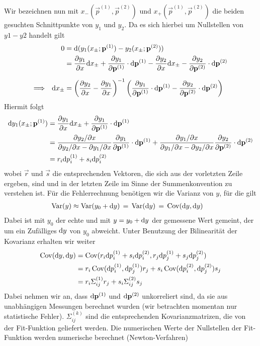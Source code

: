 Wir bezeichnen nun mit $x_{-}(\vec{p}^{(1)}, \vec{p}^{(2)})$ und $x_{+}(\vec{p}^{(1)}, \vec{p}^{(2)})$ die beiden gesuchten Schnittpunkte von $y_1$ und $y_2$. Da es sich hierbei um Nullstellen von $y1 - y2$ handelt gilt
%
\begin{align*}
               && 0 &= \mathrm{d}(y_1(x_{\pm}; \mathbf{p}^{(1)}) - y_2(x_{\pm}; \mathbf{p}^{(2)})) \\
                 && &=  \frac{\partial y_1}{\partial x} \mathrm{d} x_{\pm} + \frac{\partial y_1}{\partial \mathbf{p}^{(1)}} \cdot \mathrm{d} \mathbf{p}^{(1)}
                      - \frac{\partial y_2}{\partial x} \mathrm{d} x_{\pm} - \frac{\partial y_2}{\partial \mathbf{p}^{(2)}} \cdot \mathrm{d} \mathbf{p}^{(2)} \\[2mm]
\Longrightarrow&& \mathrm{d} x_{\pm} &= \left(\frac{\partial y_2}{\partial x} - \frac{\partial y_1}{\partial x}\right)^{-1}
                                \left( \frac{\partial y_1}{\partial \mathbf{p}^{(1)}}\cdot \mathrm{d} \mathbf{p}^{(1)} - \frac{\partial y_2}{\partial \mathbf{p}^{(2)}} \cdot \mathrm{d} \mathbf{p}^{(2)} \right)
\end{align*}
%
Hiermit folgt
%
\begin{align*}
    \mathrm{d} y_1(x_{\pm}; \mathbf{p}^{(1)}) &= \frac{\partial y_1}{\partial x} \mathrm{d} x_{\pm} + \frac{\partial y_1}{\partial \mathbf{p}^{(1)}} \cdot \mathrm{d} \mathbf{p}^{(1)} \\
                                   &= \frac{\partial y_2 / \partial x}{\partial y_2 / \partial x - \partial y_1 / \partial x} \frac{\partial y_1}{\partial \mathbf{p}^{(1)}} \cdot \mathrm{d} \mathbf{p}^{(1)} + 
                                   \frac{\partial y_1 / \partial x}{\partial y_1 / \partial x - \partial y_2 / \partial x} \frac{\partial y_2}{\partial \mathbf{p}^{(2)}} \cdot \mathrm{d} \mathbf{p}^{(2)} \\
                                   &= r_i \mathrm{d} p^{(1)}_i + s_i \mathrm{d} p^{(2)}_i
\end{align*}
%
wobei $\vec{r}$ und $\vec{s}$ die entsprechenden Vektoren, die sich aus der vorletzten Zeile ergeben, sind und in der letzten Zeile im Sinne der Summenkonvention zu verstehen ist.
Für die Fehlerrechnung benötigen wir die Varianz von $y$, für die gilt
\begin{align*}
    \operatorname{Var}(y) &\approx \operatorname{Var}(y_0 + \mathrm{d} y) \,=\, \operatorname{Var}(\mathrm{d} y) \,=\, \operatorname{Cov}(\mathrm{d} y, \mathrm{d} y)
\end{align*}
Dabei ist mit $y_0$ der echte und mit $y = y_0 + \mathrm{d} y$ der gemessene Wert gemeint, der um ein Zufälliges $\mathrm{d} y$ von $y_0$ abweicht. Unter Benutzung der Bilinearität der Kovarianz erhalten wir weiter
%
\begin{align*}
\operatorname{Cov}(\mathrm{d} y, \mathrm{d} y) &= \operatorname{Cov}(r_i \mathrm{d} p^{(1)}_i + s_i \mathrm{d} p^{(2)}_i, r_j \mathrm{d} p^{(1)}_j + s_j \mathrm{d} p^{(2)}_j) \\
            &= r_i \operatorname{Cov}(\mathrm{d} p^{(1)}_i, \mathrm{d} p^{(1)}_j) r_j + s_i \operatorname{Cov}(\mathrm{d} p^{(2)}_i, \mathrm{d} p^{(2)}_j) s_j \\
            &= r_i \Sigma^{(1)}_{i j} r_j + s_i \Sigma^{(2)}_{i j} s_j
\end{align*}
%
Dabei nehmen wir an, dass $\mathrm{d} \mathbf{p}^{(1)}$ und $\mathrm{d} \mathbf{p}^{(2)}$ unkorreliert sind, da sie aus unabhängigen Messungen berechnet wurden (wir betrachten momentan nur statistische Fehler). $\Sigma^{(k)}_{i j}$ sind die entsprechenden Kovarianzmatrizen, die von der Fit-Funktion geliefert werden. Die numerischen Werte der Nullstellen der Fit-Funktion werden numerische berechnet (Newton-Verfahren)

